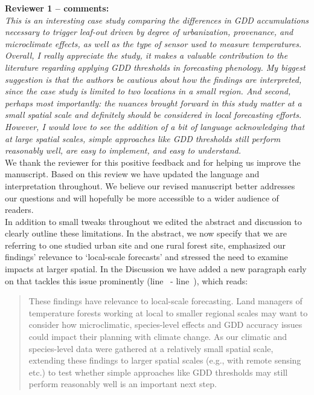 \documentclass[11pt,a4paper]{article}\usepackage[]{graphicx}\usepackage[]{color}
\newcommand{\lr}[1]{line~\lineref{#1}}
\begin{document}
\textbf {Reviewer 1 -- comments:} \\

\textit{This is an interesting case study comparing the differences in GDD accumulations necessary to trigger leaf-out driven by degree of urbanization, provenance, and microclimate effects, as well as the type of sensor used to measure temperatures. Overall, I really appreciate the study, it makes a valuable contribution to the literature regarding applying GDD thresholds in forecasting phenology. My biggest suggestion is that the authors be cautious about how the findings are interpreted, since the case study is limited to two locations in a small region. And second, perhaps most importantly: the nuances brought forward in this study matter at a small spatial scale and definitely should be considered in local forecasting efforts. However, I would love to see the addition of a bit of language acknowledging that at large spatial scales, simple approaches like GDD thresholds still perform reasonably well, are easy to implement, and easy to understand.} \\

We thank the reviewer for this positive feedback and for helping us improve the manuscript. Based on this review we have updated the language and interpretation throughout. We believe our revised manuscript better addresses our questions and will hopefully be more accessible to a wider audience of readers. \\

In addition to small tweaks throughout we edited the abstract and discussion to clearly outline these limitations. In the abstract, we now specify that we are referring to one studied urban site and one rural forest site, emphasized our findings' relevance to `local-scale forecasts' and stressed the need to examine impacts at larger spatial. In the Discussion we have added a new paragraph early on that tackles this issue prominently (\lr{Z1largespatialscale} - \lr{Z1scaleend}), which reads: \\

\begin{quotation}
\noindent These findings have relevance to local-scale forecasting. Land managers of temperature forests working at local to smaller regional scales may want to consider how microclimatic, species-level effects and GDD accuracy issues could impact their planning with climate change. As our climatic and species-level data were gathered at a relatively small spatial scale, extending these findings to larger spatial scales (e.g., with remote sensing etc.) to test whether simple approaches like GDD thresholds may still perform reasonably well is an important next step.
\end{quotation}
\end{document}
